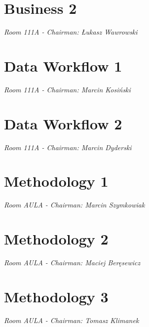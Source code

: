 \documentclass[11pt,twoside,b5paper]{book}
\begin{document}
\chapter{Business 2}{\LARGE \textit{Room 111A - Chairman: Łukasz Wawrowski}}

\newpage





\chapter{Data Workflow 1}{\LARGE \textit{Room 111A - Chairman: Marcin Kosiński}}

\newpage




\chapter{Data Workflow 2}{\LARGE \textit{Room 111A - Chairman: Marcin Dyderski}}


\newpage



\chapter{Methodology 1}{\LARGE \textit{Room AULA - Chairman: Marcin Szymkowiak}}




\chapter{Methodology 2}{\LARGE \textit{Room AULA - Chairman: Maciej Beręsewicz}}




\newpage


\chapter{Methodology 3}{\LARGE \textit{Room AULA - Chairman: Tomasz Klimanek}}




\end{document}
